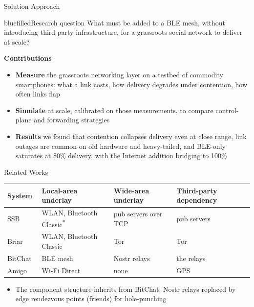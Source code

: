 \begin{frame}{Solution Approach}
    \begin{moepdef}{blue}{filled}{Research question}
        What must be added to a BLE mesh, without introducing third party infrastructure, for a grassroots social network to deliver at scale?
    \end{moepdef}\par
    \vspace{1.5ex}
    \textbf{Contributions}
    \begin{itemize}
            \item \textbf{Measure} the grassroots networking layer on a testbed of commodity smartphones: what a link costs, how delivery degrades under contention, how often links flap
            \item \textbf{Simulate} at scale, calibrated on those measurements, to compare control-plane and forwarding strategies
            \item \textbf{Results} we found that contention collapses delivery even at close range, link outages are common on old hardware and heavy-tailed, and BLE-only saturates at 80\% delivery, with the Internet addition bridging to 100\%
    \end{itemize}
\end{frame}

\begin{frame}{Related Works}
    \begin{center}
    \small
    \setlength{\tabcolsep}{5pt}
    \begin{tabular}{@{}Y{2.2cm}Y{3.6cm}Y{2.6cm}Y{2.5cm}@{}}
        \toprule
        System & Local-area underlay & Wide-area underlay & Third-party dependency \\
        \midrule
        SSB~\cite{Tarr2019} & WLAN, Bluetooth Classic\textsuperscript{*} & pub servers over TCP&pub servers\\
        Briar~\cite{briar} & WLAN, Bluetooth Classic & Tor & Tor~\cite{Aceto2026} \\
        BitChat~\cite{bitchat} & BLE mesh & Nostr relays & the relays~\cite{Wei2025} \\
        Amigo~\cite{Inyangson2025} & Wi-Fi Direct & none & GPS \\
        \bottomrule
    \end{tabular}
    \end{center}
    \begin{itemize}
        \item The component structure inherits from BitChat; Nostr relays replaced by edge rendezvous points (friends) for hole-punching
    \end{itemize}
\end{frame}
